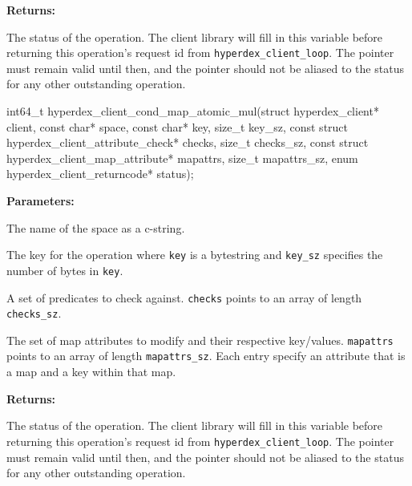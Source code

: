 \noindent\textbf{Returns:}
\begin{description}[labelindent=\widthof{{\texttt{status}}},leftmargin=*,noitemsep,nolistsep,align=right]
\item[\texttt{status}] The status of the operation.  The client library will fill in this variable before returning this operation's request id from \texttt{hyperdex\_client\_loop}.  The pointer must remain valid until then, and the pointer should not be aliased to the status for any other outstanding operation.
\end{description}

\funcsep
\begin{ccode}
int64_t hyperdex_client_cond_map_atomic_mul(struct hyperdex_client* client,
                const char* space,
                const char* key, size_t key_sz,
                const struct hyperdex_client_attribute_check* checks, size_t checks_sz,
                const struct hyperdex_client_map_attribute* mapattrs, size_t mapattrs_sz,
                enum hyperdex_client_returncode* status);
\end{ccode}
\funcdesc 

\noindent\textbf{Parameters:}
\begin{description}[labelindent=\widthof{{\texttt{mapattrs}, \texttt{mapattrs\_sz}}},leftmargin=*,noitemsep,nolistsep,align=right]
\item[\texttt{space}] The name of the space as a c-string.
\item[\texttt{key}, \texttt{key\_sz}] The key for the operation where \texttt{key} is a bytestring and \texttt{key\_sz} specifies the number of bytes in \texttt{key}.
\item[\texttt{checks}, \texttt{checks\_sz}] A set of predicates to check against.  \texttt{checks} points to an array of length \texttt{checks\_sz}.
\item[\texttt{mapattrs}, \texttt{mapattrs\_sz}] The set of map attributes to modify and their respective key/values.  \texttt{mapattrs} points to an array of length \texttt{mapattrs\_sz}.  Each entry specify an attribute that is a map and a key within that map.
\end{description}

\noindent\textbf{Returns:}
\begin{description}[labelindent=\widthof{{\texttt{status}}},leftmargin=*,noitemsep,nolistsep,align=right]
\item[\texttt{status}] The status of the operation.  The client library will fill in this variable before returning this operation's request id from \texttt{hyperdex\_client\_loop}.  The pointer must remain valid until then, and the pointer should not be aliased to the status for any other outstanding operation.
\end{description}

